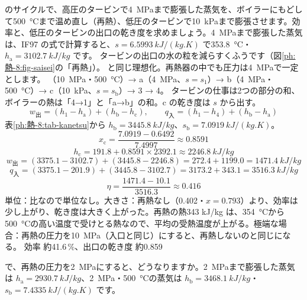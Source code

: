 \begin{phreidai}[再熱サイクルの効率]
\label{ph:熱-8:ex9}のサイクルで、高圧のタービンで\qty{4}{MPa}まで膨張した蒸気を、ボイラーにもどして\qty{500}{\celsius}まで温め直し（再熱）、低圧のタービンで\qty{10}{kPa}まで膨張させます。効率と、低圧のタービンの出口の乾き度を求めましょう。\qty{4}{MPa}まで膨張した蒸気は、IF97 の式で計算すると、$s=\qty{6.5993}{kJ/(kg.K)}$ で\qty{353.8}{\celsius}・$h_{\mathrm a}=\qty{3102.7}{kJ/kg}$ です。
\phbamen
タービンの出口の水の粒を減らすくふうです（図\ref{ph:熱-8:fig-saisei}の「再熱」）。
\phmushi
{}と同じ理想化。再熱器の中でも圧力は\qty{4}{MPa}で一定とします。
（\qty{10}{MPa}・\qty{500}{\celsius}）→ a（\qty{4}{MPa}、$s=s_1$）→ b（\qty{4}{MPa}・\qty{500}{\celsius}）→ c（\qty{10}{kPa}、$s=s_{\mathrm b}$）→ 3 → 4。
\phriyu
タービンの仕事は2つの部分の和、ボイラーの熱は「4→1」と「a→b」の和。c の乾き度は $s$ から出す。
\phtateru
\[ w_{\text{出}}=(h_1-h_{\mathrm a})+(h_{\mathrm b}-h_{\mathrm c}),\qquad q_{\text{入}}=(h_1-h_4)+(h_{\mathrm b}-h_{\mathrm a}) \]
\phtoku
表\ref{ph:熱-8:tab-kanetsu}から $h_{\mathrm b}=\qty{3445.8}{kJ/kg}$、$s_{\mathrm b}=\qty{7.0919}{kJ/(kg.K)}$。
\[ x_{\mathrm c}=\frac{7.0919-0.6492}{7.4997}\approx0.8591 \]
\[ h_{\mathrm c}=191.8+0.8591\times2392.1\approx\qty{2246.8}{kJ/kg} \]
\[ w_{\text{出}}=(3375.1-3102.7)+(3445.8-2246.8)=272.4+1199.0=\qty{1471.4}{kJ/kg} \]
\[ q_{\text{入}}=(3375.1-201.9)+(3445.8-3102.7)=3173.2+343.1=\qty{3516.3}{kJ/kg} \]
\[ \eta=\frac{1471.4-10.1}{3516.3}\approx0.416 \]
\phtashikame
単位：比なので単位なし。大きさ：再熱なし（0.402・$x=0.793$）より、効率は少し上がり、乾き度は大きく上がった。再熱の熱343 kJ/kg は、\qty{354}{\celsius}から\qty{500}{\celsius}の高い温度で受けとる熱なので、平均の受熱温度が上がる。極端な場合：再熱の圧力を\qty{10}{MPa}（入口と同じ）にすると、再熱しないのと同じになる。
\kotae 効率 約41.6\,\%、出口の乾き度 約0.859
\end{phreidai}
\begin{jibun}
で、再熱の圧力を\qty{2}{MPa}にすると、どうなりますか。\qty{2}{MPa}まで膨張した蒸気は $h_{\mathrm a}=\qty{2930.7}{kJ/kg}$、\qty{2}{MPa}・\qty{500}{\celsius}の蒸気は $h_{\mathrm b}=\qty{3468.1}{kJ/kg}$・$s_{\mathrm b}=\qty{7.4335}{kJ/(kg.K)}$ です。
\end{jibun}

